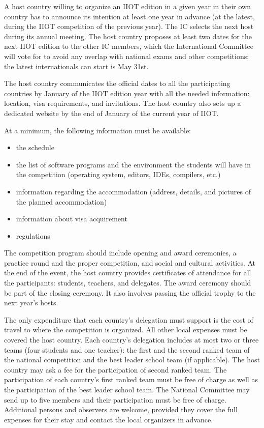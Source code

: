 \documentclass{article}
\begin{document}
A host country willing to organize an IIOT edition in a given year in their own country has to announce its intention at least one year in advance (at the latest, during the IIOT competition of the previous year). The IC selects the next host during its annual meeting. The host country proposes at least two dates for the next IIOT edition to the other IC members, which the International Committee will vote for to avoid any overlap with national exams and other competitions; the latest internationals can start is May 31st. 

The host country communicates the official dates to all the participating countries by January of the IIOT edition year with all the needed information: location, visa requirements, and invitations. The host country also sets up a dedicated website by the end of January of the current year of IIOT. 

At a minimum, the following information must be available:

\begin{itemize}
    \item the schedule
    \item the list of software programs and the environment the students will have in the competition (operating system, editors, IDEs, compilers, etc.)
    \item information regarding the accommodation (address, details, and pictures of the planned accommodation)
    \item information about visa acquirement
    \item regulations
\end{itemize}

The competition program should include opening and award ceremonies, a practice round and the proper competition, and social and cultural activities. At the end of the event, the host country provides certificates of attendance for all the participants: students, teachers, and delegates. The award ceremony should be part of the closing ceremony. It also involves passing the official trophy to the next year's hosts.

The only expenditure that each country's delegation must support is the cost of travel to where the competition is organized. All other local expenses must be covered the host country. Each country's delegation includes at most two or three teams (four students and one teacher): the first and the second ranked team of the national competition and the best leader school team (if applicable). The host country may ask a fee for the participation of second ranked team. The participation of each country's first ranked team must be free of charge as well as the participation of the best leader school team. The National Committee may send up to five members and their participation must be free of charge. Additional persons and observers are welcome, provided they cover the full expenses for their stay and contact the local organizers in advance.
\end{document}
